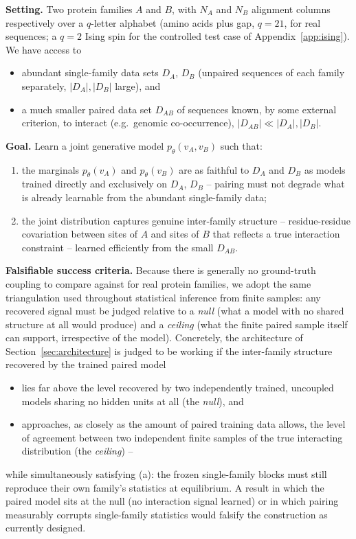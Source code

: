 \documentclass[11pt]{article}
\newcommand{\DA}{D_A}
\newcommand{\DB}{D_B}
\newcommand{\DAB}{D_{AB}}
\begin{document}
\textbf{Setting.} Two protein families $A$ and $B$, with $N_A$ and $N_B$
alignment columns respectively over a $q$-letter alphabet (amino acids
plus gap, $q=21$, for real sequences; a $q=2$ Ising spin for the
controlled test case of Appendix~\ref{app:ising}). We have access to
\begin{itemize}
\item abundant single-family data sets $\DA$, $\DB$ (unpaired sequences
of each family separately, $|\DA|,|\DB|$ large), and
\item a much smaller paired data set $\DAB$ of sequences known, by some
external criterion, to interact (e.g.\ genomic co-occurrence),
$|\DAB|\ll|\DA|,|\DB|$.
\end{itemize}

\textbf{Goal.} Learn a joint generative model $p_\theta(v_A,v_B)$ such
that:
\begin{enumerate}
\item[(a)] the marginals $p_\theta(v_A)$ and $p_\theta(v_B)$ are as
faithful to $\DA$ and $\DB$ as models trained directly and exclusively on
$\DA$, $\DB$ -- pairing must not degrade what is already learnable from
the abundant single-family data;
\item[(b)] the joint distribution captures genuine inter-family
structure -- residue-residue covariation between sites of $A$ and sites
of $B$ that reflects a true interaction constraint -- learned efficiently
from the small $\DAB$.
\end{enumerate}

\textbf{Falsifiable success criteria.} Because there is generally no
ground-truth coupling to compare against for real protein families, we
adopt the same triangulation used throughout statistical inference from
finite samples: any recovered signal must be judged relative to a
\emph{null} (what a model with no shared structure at all would produce)
and a \emph{ceiling} (what the finite paired sample itself can support,
irrespective of the model). Concretely, the architecture of
Section~\ref{sec:architecture} is judged to be working if the
inter-family structure recovered by the trained paired model
\begin{itemize}
\item lies far above the level recovered by two independently trained,
uncoupled models sharing no hidden units at all (the \emph{null}), and
\item approaches, as closely as the amount of paired training data
allows, the level of agreement between two independent finite samples of
the true interacting distribution (the \emph{ceiling}) --
\end{itemize}
while simultaneously satisfying (a): the frozen single-family blocks must
still reproduce their own family's statistics at equilibrium. A result in
which the paired model sits at the null (no interaction signal learned)
or in which pairing measurably corrupts single-family statistics would
falsify the construction as currently designed.
\end{document}
